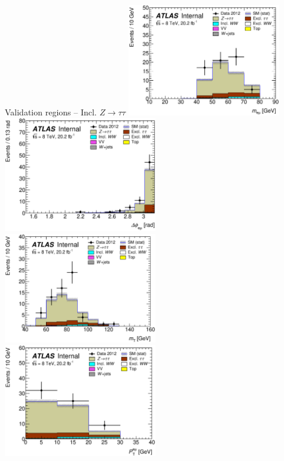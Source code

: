 \documentclass[10pt]{beamer}
\newcommand*{\Ztau}{\ensuremath{Z\to\tau\tau}}
\begin{document}
\begin{frame}{Validation regions -- Incl. \Ztau}
   \includegraphics[width=0.5\textwidth]{figures/emme-CutTopoMll-Mll_ztau-lin.eps}
   \includegraphics[width=0.5\textwidth]{figures/emme-CutTopoMll-DPhill_ztau-lin.eps}\\
   \includegraphics[width=0.5\textwidth]{figures/emme-CutTopoMll-MT_ztau-lin.eps}
   \includegraphics[width=0.5\textwidth]{figures/emme-CutTopoMll-Ptll_ztau-lin.eps}
\end{frame}
\end{document}
